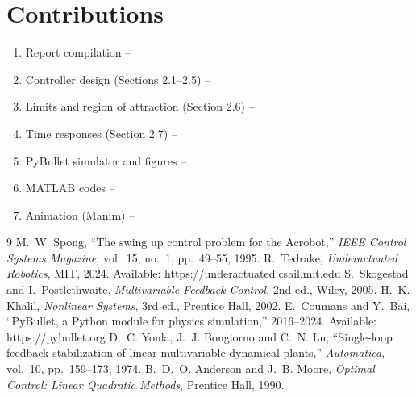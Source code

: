 \documentclass[12pt,a4paper]{article}
\begin{document}
\section{Contributions}
\begin{enumerate}
\item Report compilation -- \underline{\hspace{4cm}}
\item Controller design (Sections 2.1--2.5) -- \underline{\hspace{4cm}}
\item Limits and region of attraction (Section 2.6) -- \underline{\hspace{4cm}}
\item Time responses (Section 2.7) -- \underline{\hspace{4cm}}
\item PyBullet simulator and figures -- \underline{\hspace{4cm}}
\item MATLAB codes -- \underline{\hspace{4cm}}
\item Animation (Manim) -- \underline{\hspace{4cm}}
\end{enumerate}

\begin{thebibliography}{9}
 M.~W. Spong, ``The swing up control problem for the Acrobot,'' \emph{IEEE Control Systems Magazine}, vol.~15, no.~1, pp.~49--55, 1995.
 R.~Tedrake, \emph{Underactuated Robotics}, MIT, 2024. Available: https://underactuated.csail.mit.edu
 S.~Skogestad and I.~Postlethwaite, \emph{Multivariable Feedback Control}, 2nd ed., Wiley, 2005.
 H.~K. Khalil, \emph{Nonlinear Systems}, 3rd ed., Prentice Hall, 2002.
 E.~Coumans and Y.~Bai, ``PyBullet, a Python module for physics simulation,'' 2016--2024. Available: https://pybullet.org
 D.~C. Youla, J.~J. Bongiorno and C.~N. Lu, ``Single-loop feedback-stabilization of linear multivariable dynamical plants,'' \emph{Automatica}, vol.~10, pp.~159--173, 1974.
 B.~D.~O. Anderson and J.~B. Moore, \emph{Optimal Control: Linear Quadratic Methods}, Prentice Hall, 1990.
\end{thebibliography}
\end{document}
